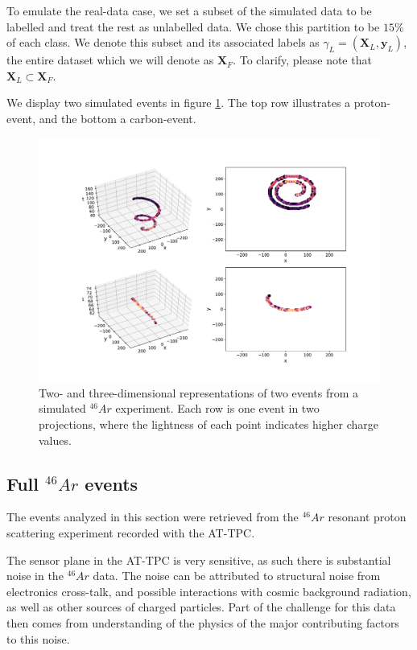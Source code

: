 To emulate the real-data case, we set a subset of the simulated data to be labelled and treat the rest as unlabelled data. We chose this partition to be $15\%$ of each class. We denote this subset and its associated labels as $\gamma_L=(\mathbf{X}_L, \mathbf{y}_L)$, the entire dataset which we will denote as $\mathbf{X}_F$. To clarify, please note that $\mathbf{X}_L \subset \mathbf{X}_F$.

We display two simulated events in figure \ref{fig:sim_samples}. The top row illustrates a proton-event, and the bottom a carbon-event. 

\begin{figure}[H]
\centering
\includegraphics[width=\textwidth]{../plots/display_eventssimulated.pdf}
\caption[Displaying simulated events in 2D and 3D]{Two- and three-dimensional representations of two events from a simulated ${}^{46}Ar$ experiment. Each row is one event in two projections, where the lightness of each point indicates higher charge values.}\label{fig:sim_samples}
\end{figure}


\subsection{Full \texorpdfstring{${}^{46}Ar$}{46Ar}  events}\label{sec:data_real}

The events analyzed in this section were retrieved from the ${}^{46}Ar$ resonant proton scattering experiment recorded with the AT-TPC. 

The sensor plane in the AT-TPC is very sensitive, as such there is substantial noise in the ${}^{46}Ar$ data. The noise can be attributed to structural noise from electronics cross-talk, and possible interactions with cosmic background radiation, as well as other sources of charged particles. Part of the challenge for this data then comes from understanding of the physics of the major contributing factors to this noise. 

